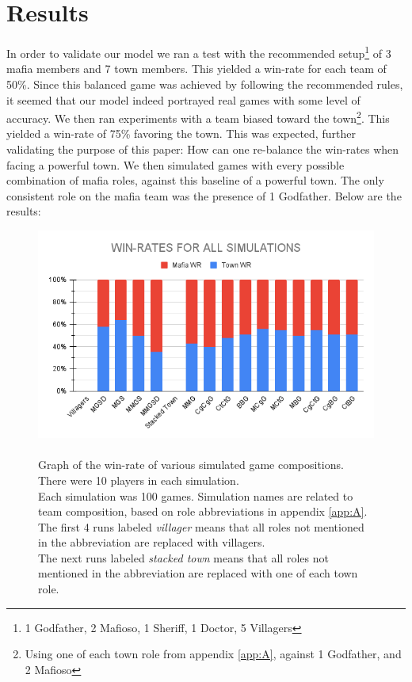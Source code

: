 \section{Results}\label{sec:results}
In order to validate our model we ran a test with the recommended
setup\footnote[1]{1 Godfather, 2 Mafioso, 1 Sheriff, 1 Doctor, 5 Villagers} of
3 mafia members and 7 town members\cite{MafiaRules}. This yielded a win-rate
for each team of 50\%. Since this balanced game was achieved by following the
recommended rules, it seemed that our model indeed portrayed real games with
some level of accuracy. We then ran experiments with a team biased toward the
town\footnote{Using one of each town role from appendix \ref{app:A}, against 1
	Godfather, and 2 Mafioso}. This yielded a win-rate of 75\% favoring the town.
This was expected, further validating the purpose of this paper: How can one
re-balance the win-rates when facing a powerful town. We then simulated games
with every possible combination of mafia roles, against this baseline of a
powerful town. The only consistent role on the mafia team was the presence of 1
Godfather. Below are the results:
\begin{figure}[h]
	\includegraphics[width=1\linewidth]{figures/Winrates}
	\caption{\\Graph of the win-rate of various simulated game compositions.\\
		There were 10 players in each simulation.\\
		Each simulation was 100 games.
		Simulation names are related to team composition, based on role
		abbreviations in appendix \ref{app:A}.\\
		The first 4 runs labeled \textit{villager} means that all roles not
		mentioned in the abbreviation are replaced with villagers.\\
		The next runs labeled \textit{stacked town} means that all roles not
		mentioned in the abbreviation are replaced with	one of each town role.}
	\label{fig:placeholder}
\end{figure}
